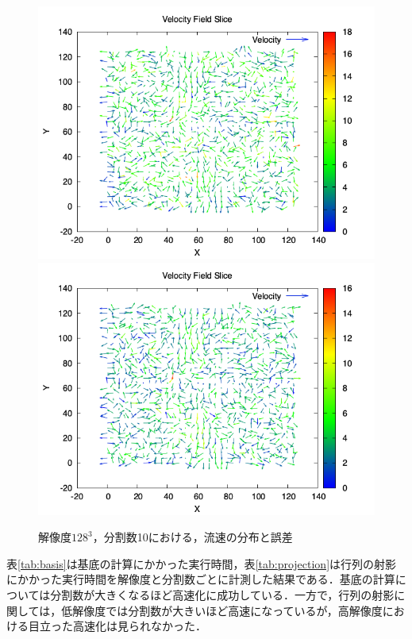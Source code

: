 \documentclass[a4j,12pt]{jreport}
\begin{document}
\begin{figure}[htbp]
\caption{$解像度128^3$，分割数10における，流速の分布と誤差}
\label{fig:n128_vel}
\centering
\includegraphics[width=140mm]{images/velocity_plot_179.png}
\includegraphics[width=140mm]{images/velocity_plot_182.png}
\end{figure}

表\ref{tab:basis}は基底の計算にかかった実行時間，表\ref{tab:projection}は行列の射影にかかった実行時間を解像度と分割数ごとに計測した結果である．基底の計算については分割数が大きくなるほど高速化に成功している．一方で，行列の射影に関しては，低解像度では分割数が大きいほど高速になっているが，高解像度における目立った高速化は見られなかった．
\end{document}
